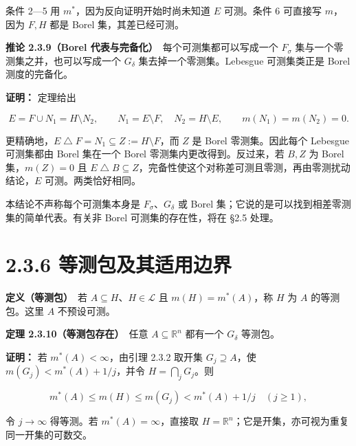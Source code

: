 \documentclass[11pt,a4paper]{article}
\begin{document}
条件 2---5 用 \(m^*\)，因为反向证明开始时尚未知道 \(E\) 可测。条件 6
可直接写 \(m\)，因为 \(F,H\) 都是 Borel 集，其差已经可测。

\textbf{推论 2.3.9（Borel 代表与完备化）}　每个可测集都可以写成一个
\(F_\sigma\) 集与一个零测集之并，也可以写成一个 \(G_\delta\)
集去掉一个零测集。Lebesgue 可测集类正是 Borel 测度的完备化。

\textbf{证明：} 定理给出

\begin{equation*}
E=F\cup N_1=H\setminus N_2,\qquad
N_1=E\setminus F,\quad N_2=H\setminus E,
\qquad m(N_1)=m(N_2)=0.
\tag{2.3.11}
\end{equation*}

更精确地，\(E\mathbin{\triangle}F=N_1\subseteq Z:=H\setminus F\)，而
\(Z\) 是 Borel 零测集。因此每个 Lebesgue 可测集都由 Borel 集在一个 Borel
零测集内更改得到。反过来，若 \(B,Z\) 为 Borel 集，\(m(Z)=0\) 且
\(E\mathbin{\triangle}B\subseteq Z\)，完备性使这个对称差可测且零测，再由零测扰动结论，\(E\)
可测。两类恰好相同。

本结论不声称每个可测集本身是 \(F_\sigma\)、\(G_\delta\) 或 Borel
集；它说的是可以找到相差零测集的简单代表。有关非 Borel
可测集的存在性，将在 §2.5 处理。

\section[\S{}2.3.6
等测包及其适用边界]{2.3.6
等测包及其适用边界}\label{ux7b49ux6d4bux5305ux53caux5176ux9002ux7528ux8fb9ux754c}

\textbf{定义（等测包）}　若 \(A\subseteq H\)、\(H\in\mathcal L\) 且
\(m(H)=m^*(A)\)，称 \(H\) 为 \(A\) 的等测包。这里 \(A\) 不预设可测。

\textbf{定理 2.3.10（等测包存在）}　任意 \(A\subseteq\mathbb R^n\)
都有一个 \(G_\delta\) 等测包。

\textbf{证明：} 若 \(m^*(A)<\infty\)，由引理 2.3.2 取开集
\(G_j\supseteq A\)，使 \(m(G_j)<m^*(A)+1/j\)，并令
\(H=\bigcap_jG_j\)。则

\begin{equation*}
m^*(A)\le m(H)\le m(G_j)<m^*(A)+1/j
\quad(j\ge1),
\tag{2.3.12}
\end{equation*}

令 \(j\to\infty\) 得等测。若 \(m^*(A)=\infty\)，直接取
\(H=\mathbb R^n\)；它是开集，亦可视为重复同一开集的可数交。
\end{document}
